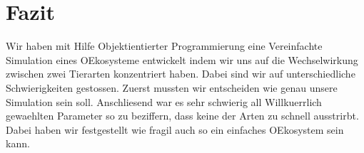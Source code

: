 \documentclass[12pt]{article}
\begin{document}
\section{Fazit}
Wir haben mit Hilfe Objektientierter Programmierung eine Vereinfachte Simulation
eines OEkosysteme entwickelt indem wir uns auf die Wechselwirkung zwischen zwei Tierarten konzentriert haben.
Dabei sind wir auf unterschiedliche Schwierigkeiten gestossen.
Zuerst mussten wir entscheiden wie genau unsere Simulation sein soll.
Anschliesend war es sehr schwierig all Willkuerrlich gewaehlten Parameter so zu beziffern, dass keine der Arten zu schnell ausstrirbt.
Dabei haben wir festgestellt wie fragil auch so ein einfaches OEkosystem sein kann.
\end{document}
